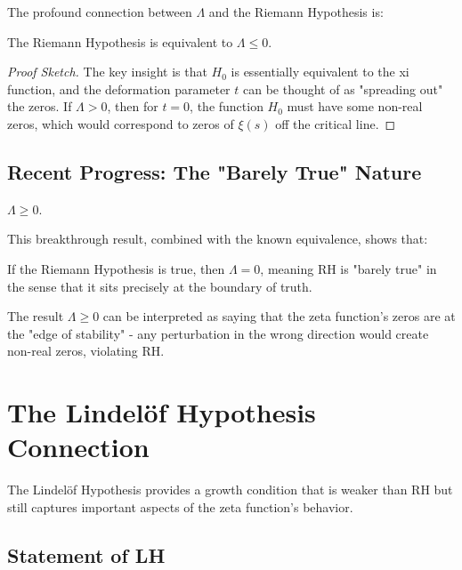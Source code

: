 The profound connection between $\Lambda$ and the Riemann Hypothesis is:

\begin{theorem}[RH Equivalence]
The Riemann Hypothesis is equivalent to $\Lambda \leq 0$.
\end{theorem}

\begin{proof}[Proof Sketch]
The key insight is that $H_0$ is essentially equivalent to the xi function, and the deformation parameter $t$ can be thought of as "spreading out" the zeros. If $\Lambda > 0$, then for $t = 0$, the function $H_0$ must have some non-real zeros, which would correspond to zeros of $\xi(s)$ off the critical line.
\end{proof}

\subsection{Recent Progress: The "Barely True" Nature}

\begin{theorem}
$\Lambda \geq 0$.
\end{theorem}

This breakthrough result, combined with the known equivalence, shows that:

\begin{corollary}
If the Riemann Hypothesis is true, then $\Lambda = 0$, meaning RH is "barely true" in the sense that it sits precisely at the boundary of truth.
\end{corollary}

\begin{remark}
The result $\Lambda \geq 0$ can be interpreted as saying that the zeta function's zeros are at the "edge of stability" - any perturbation in the wrong direction would create non-real zeros, violating RH.
\end{remark}

\section{The Lindelöf Hypothesis Connection}

The Lindelöf Hypothesis provides a growth condition that is weaker than RH but still captures important aspects of the zeta function's behavior.

\subsection{Statement of LH}


